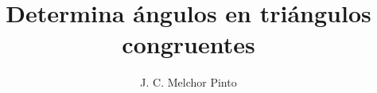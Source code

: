 \documentclass[12pt]{guia}
\title{Determina ángulos en triángulos congruentes}
\author{J. C. Melchor Pinto}
\begin{document}
\pagestyle{headandfoot}
\addpoints
\INFO
\printanswers

% 
% 
% 
% 
\newpage
\begin{questions}
    
    
    
    
    
    
    
    
    
    
\end{questions}
\end{document}
